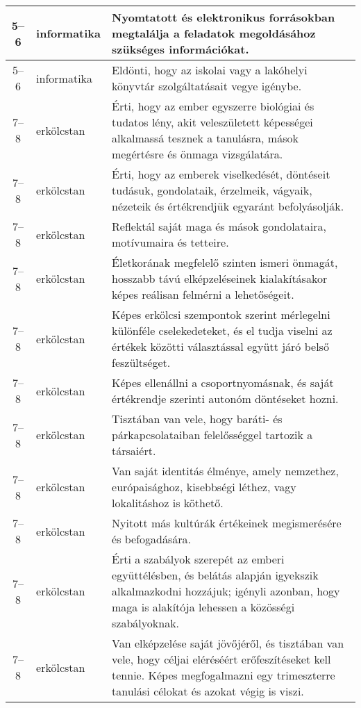 \begin{small}
\begin{longtable}{c | p{2cm} |  p{11cm} }
              5--6 & informatika & Nyomtatott és elektronikus forrásokban megtalálja a feladatok megoldásához szükséges információkat. \\ \hline
              5--6 & informatika & Eldönti, hogy az iskolai vagy a lakóhelyi könyvtár szolgáltatásait vegye igénybe. \\ \hline
              7--8 & erkölcstan & Érti, hogy az ember egyszerre biológiai és tudatos lény, akit veleszületett képességei alkalmassá tesznek a tanulásra, mások megértésre és önmaga vizsgálatára. \\ \hline
              7--8 & erkölcstan & Érti, hogy az emberek viselkedését, döntéseit tudásuk, gondolataik, érzelmeik, vágyaik, nézeteik és értékrendjük egyaránt befolyásolják. \\ \hline
              7--8 & erkölcstan & Reflektál saját maga és mások gondolataira, motívumaira és tetteire. \\ \hline
              7--8 & erkölcstan & Életkorának megfelelő szinten ismeri önmagát, hosszabb távú elképzeléseinek kialakításakor képes reálisan felmérni a lehetőségeit. \\ \hline
              7--8 & erkölcstan & Képes erkölcsi szempontok szerint mérlegelni különféle cselekedeteket, és el tudja viselni az értékek közötti választással együtt járó belső feszültséget. \\ \hline
              7--8 & erkölcstan & Képes ellenállni a csoportnyomásnak, és saját értékrendje szerinti autonóm döntéseket hozni. \\ \hline
              7--8 & erkölcstan & Tisztában van vele, hogy baráti- és párkapcsolataiban felelősséggel tartozik a társaiért. \\ \hline
              7--8 & erkölcstan & Van saját identitás élménye, amely nemzethez, európaisághoz, kisebbségi léthez, vagy lokalitáshoz is köthető. \\ \hline
              7--8 & erkölcstan & Nyitott más kultúrák értékeinek megismerésére és befogadására. \\ \hline
              7--8 & erkölcstan & Érti a szabályok szerepét az emberi együttélésben, és belátás alapján igyekszik alkalmazkodni hozzájuk; igényli azonban, hogy maga is alakítója lehessen a közösségi szabályoknak. \\ \hline
              7--8 & erkölcstan & Van elképzelése saját jövőjéről, és tisztában van vele, hogy céljai eléréséért erőfeszítéseket kell tennie. Képes megfogalmazni egy trimeszterre tanulási célokat és azokat végig is viszi. \\ \hline

\end{longtable}
\end{small}
